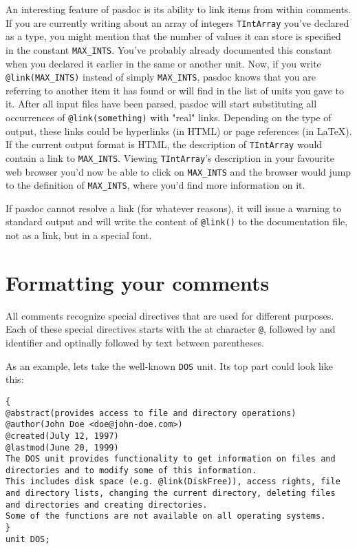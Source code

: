 \documentclass[11pt]{article}
\begin{document}
An interesting feature of pasdoc is its ability to link items from within
comments. If you are currently writing about an array of integers {\tt TIntArray} you've
declared as a type, you might mention that the number of values it can store
is specified in the constant {\tt MAX\_INTS}.
You've probably already documented this constant when you declared it earlier
in the same or another unit.
Now, if you write {\tt @link(MAX\_INTS)} instead of simply {\tt MAX\_INTS},
pasdoc knows that you are referring to another item it has found or will find
in the list of units you gave to it.
After all input files have been parsed, pasdoc will start substituting all
occurrences of {\tt @link(something)} with "real" links.
Depending on the type of output, these links could be hyperlinks (in HTML)
or page references (in \LaTeX).
If the current output format is HTML, the description of {\tt TIntArray} would
contain a link to {\tt MAX\_INTS}.
Viewing {\tt TIntArray}'s description in your favourite web browser you'd
now be able to click on {\tt MAX\_INTS} and the browser would jump to the
definition of {\tt MAX\_INTS}, where you'd find more information on it.

If pasdoc cannot resolve a link (for whatever reasons), it will issue a
warning to standard output and will write the content of {\tt @link()}
to the documentation file, not as a link, but in a special font.

\section{Formatting your comments}

All comments recognize special directives that are used for different
purposes. Each of these special directives starts with the at character 
{\tt @}, followed by and identifier and optinally followed by text 
between parentheses. 

As an example, lets take the well-known {\tt DOS} unit.
Its top part could look like this:
\begin{verbatim}
{
@abstract(provides access to file and directory operations)
@author(John Doe <doe@john-doe.com>)
@created(July 12, 1997)
@lastmod(June 20, 1999)
The DOS unit provides functionality to get information on files and
directories and to modify some of this information.
This includes disk space (e.g. @link(DiskFree)), access rights, file
and directory lists, changing the current directory, deleting files
and directories and creating directories.
Some of the functions are not available on all operating systems.
}
unit DOS;
\end{verbatim}
\end{document}
